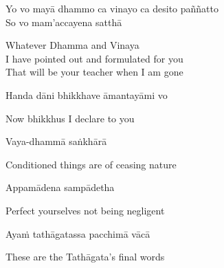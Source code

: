 Yo vo mayā dhammo ca vinayo ca desito paññatto\\
So vo mam'accayena satthā

\begin{english-verses}
  Whatever Dhamma and Vinaya\\
  I have pointed out and formulated for you\\
  That will be your teacher when I am gone
\end{english-verses}

Handa dāni bhikkhave āmantayāmi vo

\begin{english}
  Now bhikkhus I declare to you
\end{english}

Vaya-dhammā saṅkhārā

\begin{english}
  Conditioned things are of ceasing nature\ifdigitalversion\makeatletter\hyperlink{endnote94-appendix}\makeatother\fi
\end{english}

Appamādena sampādetha

\begin{english}
  Perfect yourselves not being negligent
\end{english}

Ayaṁ tathāgatassa pacchimā vācā

\begin{english}
  These are the Tathāgata's final words
\end{english}

\suttaRef{[DN 16]}

\enlargethispage{\baselineskip\vspace{-1.0em}}
\ifdigitalversion{}\fi

